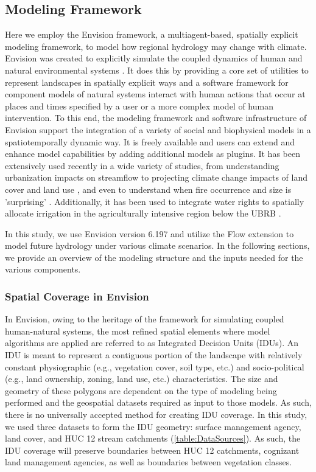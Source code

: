 \documentclass[11pt,letterpaper]{article}
\begin{document}
\subsection{Modeling Framework}
Here we employ the Envision framework, a multiagent-based, spatially explicit modeling framework, to model how regional hydrology may change with climate. Envision was created to explicitly simulate the coupled dynamics of human and natural environmental systems \citep{Bolte:2007tb}. It does this by providing a core set of utilities to represent landscapes in spatially explicit ways and a software framework for component models of natural systems interact with human actions that occur at places and times specified by a user or a more complex model of human intervention. To this end, the modeling framework and software infrastructure of Envision support the integration of a variety of social and biophysical models in a spatiotemporally dynamic way. It is freely available and users can extend and enhance model capabilities by adding additional models as plugins. It has been extensively used recently in a wide variety of studies, from understanding urbanization impacts on streamflow \citep{Wu:2015tx} to projecting climate change impacts of land cover and land use \citep{Turner:2015wn}, and even to understand when fire occurrence and size is 'surprising' \citep{Hulse:2016wy}. Additionally, it has been used to integrate water rights to spatially allocate irrigation in the agriculturally intensive region below the UBRB \citep{Han:2017tx}. 

In this study, we use Envision version 6.197 and utilize the Flow extension to model future hydrology under various climate scenarios. In the following sections, we provide an overview of the modeling structure and the inputs needed for the various components.

\subsubsection{Spatial Coverage in Envision}

In Envision, owing to the heritage of the framework for simulating coupled human-natural systems, the most refined spatial elements where model algorithms are applied are referred to as Integrated Decision Units (IDUs). An IDU is meant to represent a contiguous portion of the landscape with relatively constant physiographic (e.g., vegetation cover, soil type, etc.) and socio-political (e.g., land ownership, zoning, land use, etc.) characteristics.  The size and geometry of these polygons are dependent on the type of modeling being performed and the geospatial datasets required as input to those models. As such, there is no universally accepted method for creating IDU coverage. In this study, we used three datasets to form the IDU geometry: surface management agency, land cover, and HUC 12 stream catchments (\cref{table:DataSources}). As such, the IDU coverage will preserve boundaries between HUC 12 catchments, cognizant land management agencies, as well as boundaries between vegetation classes.  
\end{document}
